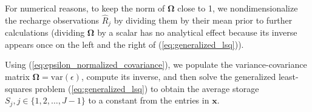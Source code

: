 \documentclass[11pt,a4paper]{article}
\renewcommand{\vec}[1]{\mathbf{#1}}
\begin{document}
For numerical reasons, to keep the
norm of $\bm{\Omega}$ close to 1, we nondimensionalize the recharge
observations $\widehat{R}_j$ by dividing them by their mean prior to
further calculations (dividing $\bm{\Omega}$ by a scalar has no
analytical effect because its inverse appears once on the left and the
right of (\ref{eq:generalized_lsq})).

Using (\ref{eq:epsilon_normalized_covariance}), we populate the
variance-covariance matrix
$\bm{\Omega} = \text{var}(\mathbb\epsilon)$, compute its inverse, and
then solve the generalized least-squares problem
(\ref{eq:generalized_lsq}) to obtain the average storage
$S_j, j \in \{1, 2, \ldots, J - 1\}$ to a constant from the entries in
$\vec{x}$.
\end{document}
